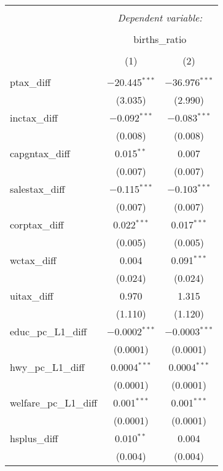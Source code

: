 
\begin{table}[!htbp] \centering 
  \caption{} 
  \label{} 
\begin{tabular}{@{\extracolsep{5pt}}lcc} 
\\[-1.8ex]\hline 
\hline \\[-1.8ex] 
 & \multicolumn{2}{c}{\textit{Dependent variable:}} \\ 
\cline{2-3} 
\\[-1.8ex] & \multicolumn{2}{c}{births\_ratio} \\ 
\\[-1.8ex] & (1) & (2)\\ 
\hline \\[-1.8ex] 
 ptax\_diff & $-$20.445$^{***}$ & $-$36.976$^{***}$ \\ 
  & (3.035) & (2.990) \\ 
  inctax\_diff & $-$0.092$^{***}$ & $-$0.083$^{***}$ \\ 
  & (0.008) & (0.008) \\ 
  capgntax\_diff & 0.015$^{**}$ & 0.007 \\ 
  & (0.007) & (0.007) \\ 
  salestax\_diff & $-$0.115$^{***}$ & $-$0.103$^{***}$ \\ 
  & (0.007) & (0.007) \\ 
  corptax\_diff & 0.022$^{***}$ & 0.017$^{***}$ \\ 
  & (0.005) & (0.005) \\ 
  wctax\_diff & 0.004 & 0.091$^{***}$ \\ 
  & (0.024) & (0.024) \\ 
  uitax\_diff & 0.970 & 1.315 \\ 
  & (1.110) & (1.120) \\ 
  educ\_pc\_L1\_diff & $-$0.0002$^{***}$ & $-$0.0003$^{***}$ \\ 
  & (0.0001) & (0.0001) \\ 
  hwy\_pc\_L1\_diff & 0.0004$^{***}$ & 0.0004$^{***}$ \\ 
  & (0.0001) & (0.0001) \\ 
  welfare\_pc\_L1\_diff & 0.001$^{***}$ & 0.001$^{***}$ \\ 
  & (0.0001) & (0.0001) \\ 
  hsplus\_diff & 0.010$^{**}$ & 0.004 \\ 
  & (0.004) & (0.004) \\ 

\end{tabular}
\end{table}

